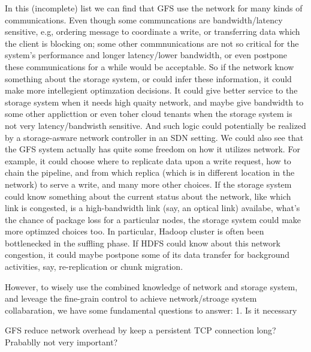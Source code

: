 In this (incomplete) list we can find that GFS use the network for many kinds of communications. Even though some communcations are bandwidth/latency sensitive, e.g, ordering message to coordinate a write, or transferring data which the client is blocking on; some other commnunications are not so critical for the system's performance and longer latency/lower bandwidth, or even postpone these communications for a while would be acceptable. So if the network know something about the storage system, or could infer these information, it could make more intellegient optimzation decisions. It could give better service to the storage system when it needs high quaity network, and maybe give bandwidth to some other applicttion or even toher cloud tenants when the storage system is not very latency/bandwisth sensitive.  And such logic could potentially be realized by a storage-asware network controller in an SDN setting. We could also see that the GFS system actually has quite some freedom on how it utilizes network. For example, it could choose where to replicate data upon a write request, how to chain the pipeline, and from which replica (which is in different location in the network) to serve a write, and many more other choices. If the storage system could know something about the current status about the network, like which link is congested, is a high-bandwidth link (say, an optical link) availabe, what's the chance of package loss for a particular nodes, the storage system could make more optimzed choices too. In particular, Hadoop cluster is often been bottlenecked in the suffling phase. If HDFS could know about this network congestion, it could maybe postpone some of its data transfer for background activities, say, re-replication or chunk migration.

However, to wisely use the combined knowledge of network and storage system, and leveage the fine-grain control to achieve network/stroage system collabaration, we have some fundamental questions to answer:
1. Is it necessary




GFS reduce network overhead by keep a persistent TCP connection long? Prabablly not very important?
